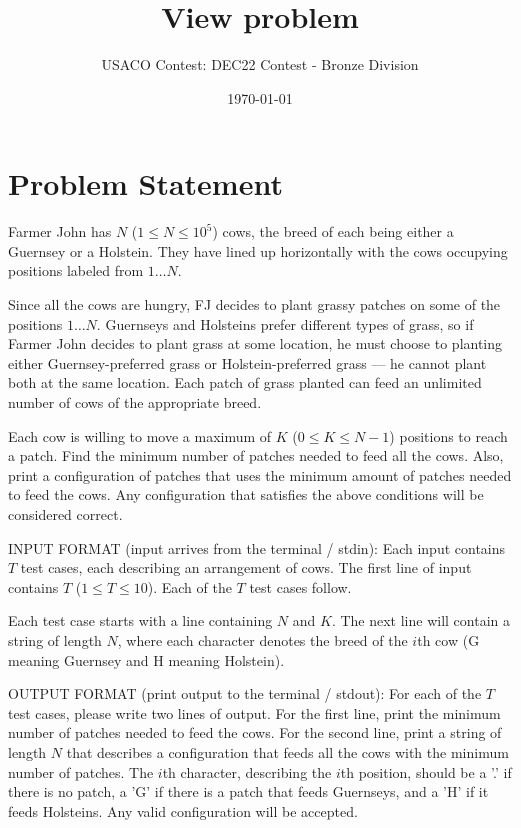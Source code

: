 \documentclass[12pt]{article}
\title{View problem}
\author{USACO Contest: DEC22 Contest - Bronze Division}
\date{\today}
\begin{document}
\maketitle

\section*{Problem Statement}

Farmer John has $N$ ($1 \le {N} \le {10^5}$) cows, the breed of each being
either a Guernsey or a Holstein. They have lined up horizontally with the cows occupying positions 
labeled from
$1\dots N$.

Since all the cows are hungry, FJ decides to plant grassy patches on some
of the positions $1\dots N$. Guernseys and Holsteins prefer different types of
grass, so if Farmer John decides to plant grass at some location, he must choose
to planting either Guernsey-preferred grass or Holstein-preferred grass --- he
cannot plant both at the same location. Each patch of grass planted can feed an
unlimited number of cows of the appropriate breed. 

Each cow is willing to move a maximum of $K$ ($0 \le {K} \le N-1$) positions to
reach a patch. Find the minimum number of patches needed to feed all the cows.
Also, print a configuration of patches that uses the minimum amount of patches
needed to feed the cows. Any configuration that satisfies the above conditions
will be considered correct.

INPUT FORMAT (input arrives from the terminal / stdin):
Each input contains $T$ test cases, each describing an arrangement of cows. The
first line of input contains $T$ ($1 \le T \le 10$). Each of the $T$ test cases
follow.

Each test case starts with a line containing $N$ and $K$. The next line will
contain a string of length $N$, where each character denotes the breed of the
$i$th cow (G meaning Guernsey and H meaning Holstein).

OUTPUT FORMAT (print output to the terminal / stdout):
For each of the $T$ test cases, please write two lines of output. For the first
line, print the minimum number of patches needed to feed the cows. For the
second line, print a string of length $N$ that describes a configuration  that
feeds all the cows with the minimum number of patches. The $i$th character,
describing the $i$th position, should be a '.' if there is no patch, a 'G' if
there is a patch that feeds Guernseys, and a 'H' if it feeds Holsteins. Any
valid configuration will be accepted.
\end{document}
